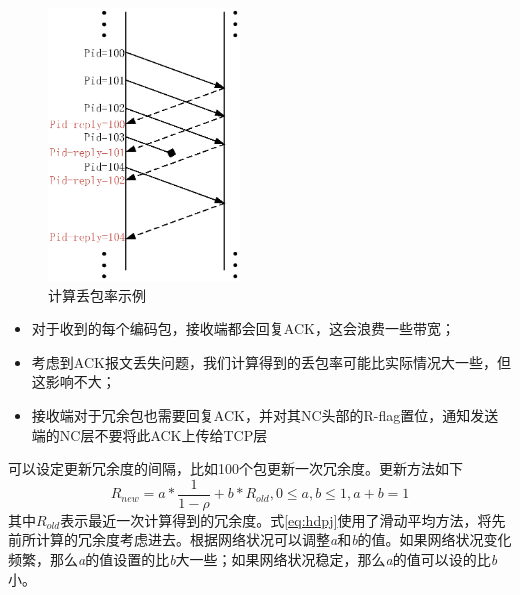 \begin{figure}[htbp]
	\centering
	\includegraphics[width=2in]{figures/diubao.eps}
	\caption{计算丢包率示例}
	\label{DIUBAO_EPS}
\end{figure}
\begin{itemize}[leftmargin=.5in]
	\item 对于收到的每个编码包，接收端都会回复ACK，这会浪费一些带宽；
	\item 考虑到ACK报文丢失问题，我们计算得到的丢包率可能比实际情况大一些，但这影响不大；
	\item 接收端对于冗余包也需要回复ACK，并对其NC头部的R-flag置位，通知发送端的NC层不要将此ACK上传给TCP层
\end{itemize}
\par
可以设定更新冗余度的间隔，比如100个包更新一次冗余度。更新方法如下
\begin{equation}\label{eq:hdpj}
R_{new}=a*\frac{1}{1-\rho}+b*R_{old},0 \le a,b \le 1,a+b=1
\end{equation}
其中$R_{old}$表示最近一次计算得到的冗余度。式\ref{eq:hdpj}使用了滑动平均方法，将先前所计算的冗余度考虑进去。根据网络状况可以调整\emph{a}和\emph{b}的值。如果网络状况变化频繁，那么\emph{a}的值设置的比\emph{b}大一些；如果网络状况稳定，那么\emph{a}的值可以设的比\emph{b}小。
